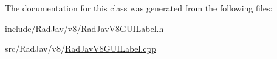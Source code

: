 The documentation for this class was generated from the following files\+:\begin{DoxyCompactItemize}
\item 
include/\+Rad\+Jav/v8/\mbox{\hyperlink{_rad_jav_v8_g_u_i_label_8h}{Rad\+Jav\+V8\+G\+U\+I\+Label.\+h}}\item 
src/\+Rad\+Jav/v8/\mbox{\hyperlink{_rad_jav_v8_g_u_i_label_8cpp}{Rad\+Jav\+V8\+G\+U\+I\+Label.\+cpp}}\end{DoxyCompactItemize}
